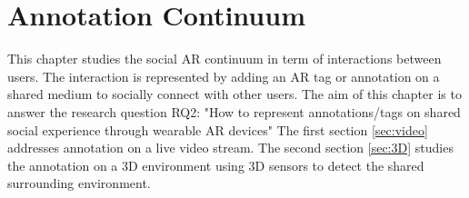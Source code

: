 \chapter{Annotation Continuum} %
\label{ch:annotation} %

This chapter studies the social AR continuum in term of interactions between users. The interaction is represented by adding an AR tag or annotation on a shared medium to socially connect with other users. 
The aim of this chapter is to answer the research question RQ2: "How to represent annotations/tags on shared social experience through wearable AR devices"
The first section \ref{sec:video} addresses annotation on a live video stream. The second section \ref{sec:3D} studies the annotation on a 3D environment using 3D sensors to detect the shared surrounding environment. 






